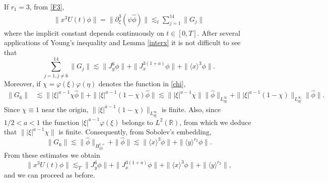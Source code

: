 \documentclass[reqno]{amsart}
\newcommand{\lanx}{\langle x \rangle}
\newcommand{\lany}{\langle y \rangle}
\newcommand{\R}{\mathbb R}
\numberwithin{equation}{section}
\begin{document}
If  $r_1=3$, from \eqref{F3},
\begin{equation*}
\begin{split}\label{r1D3}
\|x^{3}U(t)\phi\| =\|\partial_{\xi}^3(\psi\hat{\phi})\|\lesssim_t \sum_{j=1}^{14}\|G_j\|
\end{split}
\end{equation*}
where the implicit constant depends continuously on $t\in[0,T]$. After several applications of Young's inequality and Lemma \ref{interx} it is not difficult to see that
$$
\sum_{j=1,j\neq6}^{14}\|G_j\|\lesssim \|J_y^{6}\phi\|+\|J_x^{3(1+a)}\phi\|+\|\lanx^{3}\phi\|.
$$
Moreover, if $\chi=\varphi(\xi)\varphi(\eta)$ denotes the function in \eqref{chi},
\begin{equation*}
\begin{split}
\|G_6\|&\lesssim \||\xi|^{a-1}\chi\hat{\phi}\|+\||\xi|^{a-1}(1-\chi)\hat{\phi}\|
\lesssim  \||\xi|^{a-1}\chi\|\|\hat{\phi}\|_{L^\infty_{\eta \xi}}+\||\xi|^{a-1}(1-\chi)\|_{L^\infty_{\eta \xi}}\|\hat{\phi}\|.
\end{split}
\end{equation*}
Since $\chi\equiv1$  near the origin, $\||\xi|^{a-1}(1-\chi)\|_{L^\infty_{\eta \xi}}$ is finite. Also, since $1/2<a<1$ the function $|\xi|^{a-1}\varphi(\xi)$ belongs to $L^2(\R)$, from which we deduce that $ \||\xi|^{a-1}\chi\|$ is finite. Consequently, from Sobolev's embedding,
\begin{equation}\label{G6est}
\|G_6\|\lesssim \|\hat{\phi}\|_{H^{1+}_{\xi \eta}}+\|\hat{\phi}\|\lesssim \|\lanx^{3}\phi\|+\|\lany^{r_2}\phi\|.
\end{equation}
From these estimates we obtain
$$
\|x^{3}U(t)\phi\|\lesssim_T \|J_y^{6}\phi\|+\|J_x^{3(1+a)}\phi\|+\|\lanx^{3}\phi\|+\|\lany^{r_2}\|,
$$
and we can proceed as before.
\end{document}
